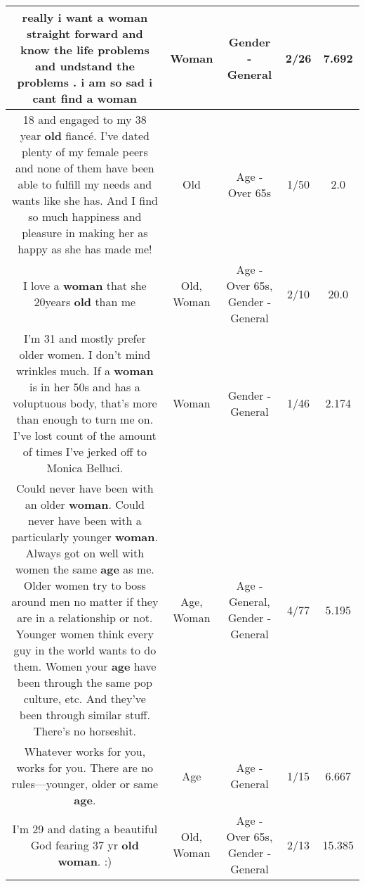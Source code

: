 \documentclass[11pt]{article}
\newlength\mylength
\begin{document}
\begin{center}
\begin{longtable}{|C{.65\mylength}|C{.30\mylength}|C{.12\mylength}|C{.12\mylength}|C{.12\mylength}|}
  \small really i want a \textbf{woman} straight forward and know the life problems and undstand the problems . i am so sad i cant find a woman\normalsize   & Woman & Gender - General & 2/26 & 7.692 \\  \hline
  \small 18 and engaged to my 38 year \textbf{old} fiancé. I've dated plenty of my female peers and none of them have been able to fulfill my needs and wants like she has. And I find so much happiness and pleasure in making her as happy as she has made me!\normalsize   & Old & Age - Over 65s & 1/50 & 2.0 \\  \hline
  \small I love a \textbf{woman} that she 20years \textbf{old} than me\normalsize   & Old, Woman & Age - Over 65s, Gender - General & 2/10 & 20.0 \\  \hline
  \small I'm 31 and mostly prefer older women. I don't mind wrinkles much. If a \textbf{woman} is in her 50s and has a voluptuous body, that's more than enough to turn me on. I've lost count of the amount of times I've jerked off to Monica Belluci.\normalsize   & Woman & Gender - General & 1/46 & 2.174 \\  \hline
  \small Could never have been with an older \textbf{woman}. Could never have been with a particularly younger \textbf{woman}. Always got on well with women the same \textbf{age} as me. Older women try to boss around men no matter if they are in a relationship or not. Younger women think every guy in the world wants to do them. Women your \textbf{age} have been through the same pop culture, etc. And they've been through similar stuff. There's no horseshit.\normalsize   & Age, Woman & Age - General, Gender - General & 4/77 & 5.195 \\  \hline
  \small Whatever works for you, works for you. There are no rules—younger, older or same \textbf{age}.\normalsize   & Age & Age - General & 1/15 & 6.667 \\  \hline
  \small I'm 29 and dating a beautiful God fearing 37 yr \textbf{old} \textbf{woman}. :)\normalsize   & Old, Woman & Age - Over 65s, Gender - General & 2/13 & 15.385 \\  \hline

\end{longtable}
\end{center}
\end{document}
